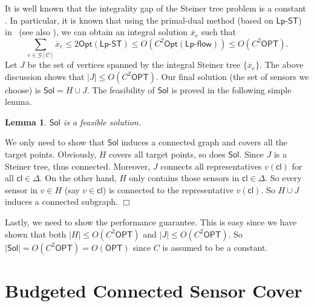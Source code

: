 \documentclass[11pt]{article}
\newcommand{\calC}{{\mathcal C}}
\newcommand{\calG}{{\mathcal G}}
\newcommand{\opt}{\mathsf{Opt}}
\newcommand{\OPT}{\mathsf{OPT}}
\newcommand{\sol}{\mathsf{Sol}}
\newcommand{\bx}{\overline{x}}
\newcommand{\lpflow}{\mathsf{Lp}\text{-}\mathsf{flow}}
\newcommand{\lpsteiner}{\mathsf{Lp}\text{-}\mathsf{ST}}
\newcommand{\cell}{\mathsf{cl}}
\newcommand{\setcell}{\mathsf{\Delta}}
\newenvironment{proof}{\noindent {\em Proof: }\ignorespaces}{}
\newcommand{\qed}{\hspace*{\fill}$\Box$\medskip}
\newtheorem{lemma}{Lemma}
\begin{document}
It is well known that the integrality gap of the Steiner tree problem is a constant \cite{williamson2011design}.
In particular, it is known that using the primal-dual method (based on $\lpsteiner$) in~\cite{goemans1995general}
(see also \cite[Chapter 7.2]{williamson2011design}),
we can obtain an integral solution $\bx_e$ such that
$$
\sum_{e\in \calG[\calC]} \bx_e \leq 2\opt(\lpsteiner) \leq O(C^2 \opt(\lpflow)) \leq O(C^2\OPT).
$$
Let $J$ be the set of vertices spanned by the integral Steiner tree $\{\bx_e\}$.
The above discussion shows that $|J|\leq O(C^2\OPT)$.
Our final solution (the set of sensors we choose) is
$\sol=H\cup J.$
The feasibility of $\sol$ is proved in the following simple lemma.
\begin{lemma}
	$\sol$ is a feasible solution.
	\label{lm:final1}
\end{lemma}
\begin{proof}
	We only need to show that $\sol$
	induces a connected graph and covers all the target points.
	Obviously, $H$ covers all target points, so does $\sol$.
	Since $J$ is a Steiner tree, thus connected. Moreover, $J$ connects
	all representatives $v(\cell)$ for all $\cell\in \setcell$. On the other hand,
	$H$ only contains those sensors in $\cell\in \setcell$.
	So every sensor in $v\in H$ (say $v\in\cell$) is connected to the representative $v(\cell)$.
	So $H\cup J$ induces a connected subgraph.
	\qed
\end{proof}

Lastly, we need to show the performance guarantee.
This is easy since we have shown that
both $|H|\leq O(C^2\OPT)$ and $|J|\leq O(C^2\OPT)$.
So $|\sol|=O(C^2\OPT)=O(\OPT)$ since $C$ is assumed to be a constant.

\section{Budgeted Connected Sensor Cover}
\label{sec:bcsc}
\end{document}
